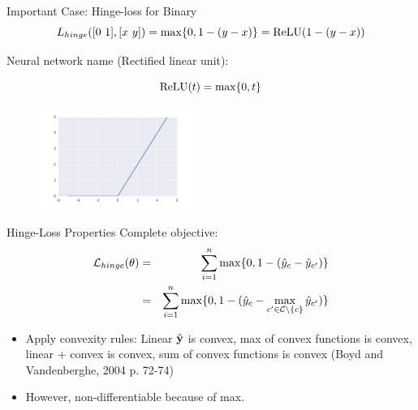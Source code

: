 \documentclass{beamer}
\begin{document}
\begin{frame}{Important Case: Hinge-loss for Binary }
  \[L_{hinge}([0\ 1], [x\ y]) = \max\{0, 1 - (y -x) \} = \relu(1 -(y-x)) \] 


  Neural network name (Rectified linear unit):

  \[\relu(t) = \max\{0, t\}  \]

  \begin{figure}
    \centering
    \includegraphics[width=5cm]{Relu}
  \end{figure}

\end{frame}








\begin{frame}{Hinge-Loss Properties}
  Complete objective:
  \begin{eqnarray*}
     \mathcal{L}_{hinge}(\theta) &=& \sum_{i=1}^n \max\{0, 1 - (\hat{y}_{c} - \hat{y}_{c'})\} \\
    &=& \sum_{i=1}^n \max\{0,  1 - (\hat{y}_{c} - \max_{c' \in \mathcal{C} \setminus\{c\}} \hat{y}_{c'}) \}     
  \end{eqnarray*}


  \begin{itemize}
  \item Apply convexity rules: Linear $\hat{\mathbf{y}}$ is convex, 
    max of convex functions is convex, linear + convex is convex, sum of convex functions is convex (Boyd and  Vandenberghe, 2004 p. 72-74)
  \item However, non-differentiable because of max.
  \end{itemize}
\end{frame}
\end{document}
